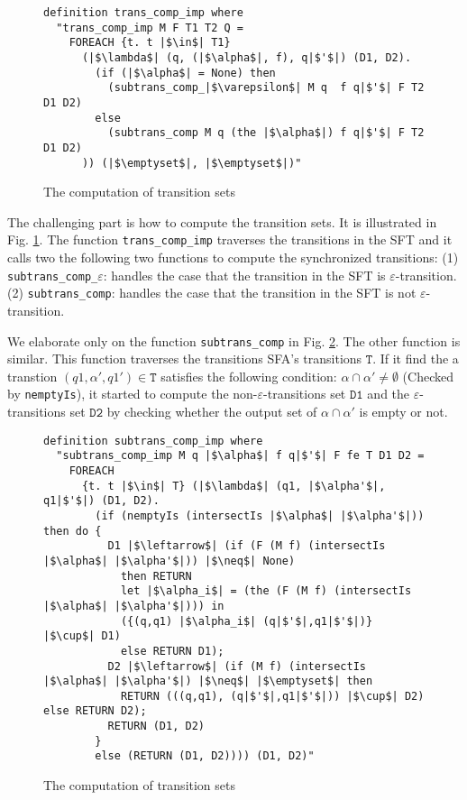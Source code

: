 \documentclass[a4paper,UKenglish,cleveref, autoref, thm-restate]{lipics-v2021}
\begin{document}
\begin{figure}[hbt!]
	\begin{lstlisting}
definition trans_comp_imp where
  "trans_comp_imp M F T1 T2 Q =
    FOREACH {t. t |$\in$| T1}
      (|$\lambda$| (q, (|$\alpha$|, f), q|$'$|) (D1, D2). 
        (if (|$\alpha$| = None) then 
          (subtrans_comp_|$\varepsilon$| M q  f q|$'$| F T2 D1 D2)
        else 
          (subtrans_comp M q (the |$\alpha$|) f q|$'$| F T2 D1 D2)
      )) (|$\emptyset$|, |$\emptyset$|)"
\end{lstlisting}
\caption{The computation of transition sets}
\label{fig-def-prods-imp}
\end{figure}

The challenging part is how to compute the transition sets. It is illustrated in Fig. \ref{fig-def-prods-imp}. The function \texttt{trans\_comp\_imp} traverses the transitions in the SFT and it calls two the following two functions to compute the synchronized transitions:
(1) \texttt{subtrans\_comp\_$\varepsilon$}: handles the case that the transition in the SFT is $\varepsilon$-transition.
(2) \texttt{subtrans\_comp}: handles the case that the transition in the SFT is not $\varepsilon$-transition.

We elaborate only on the function \texttt{subtrans\_comp} in Fig. \ref{fig-def-subtrans_comp}. The other function is similar. 
This function traverses the transitions SFA's transitions $\texttt{T}$. If it find the a transtion $(q1, \alpha', q1')\in \texttt{T}$ satisfies the following condition:
$\alpha \cap \alpha' \neq \emptyset$ (Checked by \texttt{nemptyIs}),
it started to compute the non-$\varepsilon$-transitions set $\texttt{D1}$ and the $\varepsilon$-transitions set $\texttt{D2}$ by checking whether the output set of $\alpha \cap \alpha'$ is empty or not.


\begin{figure}[hbt!]
	\begin{lstlisting}
definition subtrans_comp_imp where
  "subtrans_comp_imp M q |$\alpha$| f q|$'$| F fe T D1 D2 =
    FOREACH
      {t. t |$\in$| T} (|$\lambda$| (q1, |$\alpha'$|, q1|$'$|) (D1, D2).
        (if (nemptyIs (intersectIs |$\alpha$| |$\alpha'$|)) then do {
          D1 |$\leftarrow$| (if (F (M f) (intersectIs |$\alpha$| |$\alpha'$|)) |$\neq$| None) 
            then RETURN 
            let |$\alpha_i$| = (the (F (M f) (intersectIs |$\alpha$| |$\alpha'$|))) in
            ({(q,q1) |$\alpha_i$| (q|$'$|,q1|$'$|)} |$\cup$| D1)
            else RETURN D1);
          D2 |$\leftarrow$| (if (M f) (intersectIs |$\alpha$| |$\alpha'$|) |$\neq$| |$\emptyset$| then 
            RETURN (((q,q1), (q|$'$|,q1|$'$|)) |$\cup$| D2) else RETURN D2);
          RETURN (D1, D2)
        }
        else (RETURN (D1, D2)))) (D1, D2)"
    \end{lstlisting}
    \caption{The computation of transition sets}
    \label{fig-def-subtrans_comp}
    \end{figure}
\end{document}

